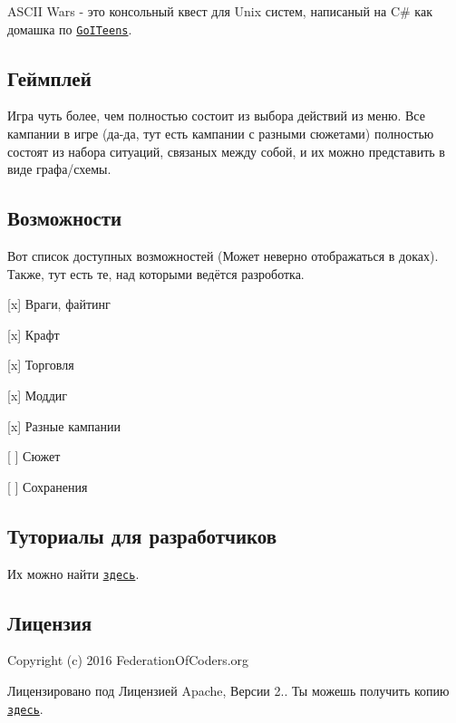 A\+S\+C\+II Wars -\/ это консольный квест для Unix систем, написаный на C\# как домашка по \href{http://goiteens.goit.ua/language/ru/}{\tt Go\+I\+Teens}.

\subsection*{Геймплей}

Игра чуть более, чем полностью состоит из выбора действий из меню. Все кампании в игре (да-\/да, тут есть кампании с разными сюжетами) полностью состоят из набора ситуаций, связаных между собой, и их можно представить в виде графа/схемы.

\subsection*{Возможности}

Вот список доступных возможностей (Может неверно отображаться в доках). Также, тут есть те, над которыми ведётся разроботка.


\begin{DoxyItemize}
\item \mbox{[}x\mbox{]} Враги, файтинг
\item \mbox{[}x\mbox{]} Крафт
\item \mbox{[}x\mbox{]} Торговля
\item \mbox{[}x\mbox{]} Моддиг
\item \mbox{[}x\mbox{]} Разные кампании
\item \mbox{[} \mbox{]} Сюжет
\item \mbox{[} \mbox{]} Сохранения
\end{DoxyItemize}

\subsection*{Туториалы для разработчиков}

Их можно найти \href{https://github.com/fed-of-coders/ASCIIWars/blob/master/Src/ASCIIWars/Tutorials/}{\tt здесь}.

\subsection*{Лицензия}

Copyright (c) 2016 Federation\+Of\+Coders.\+org

Лицензировано под Лицензией Apache, Версии 2.. Ты можешь получить копию \href{http://www.apache.org/licenses/LICENSE-2.0}{\tt здесь}. 
